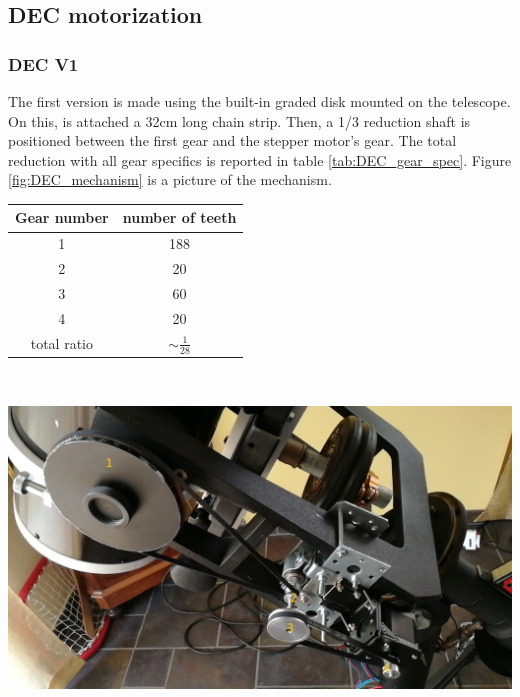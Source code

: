 \documentclass{article}
\begin{document}
\begin{multicols}{2}
\begin{minipage}{.5\textwidth}
            \label{fig:RA_mechanization}         
        \end{minipage}

        \subsection{DEC motorization}
        \subsubsection{DEC V1}
        The first version is made using the built-in graded disk mounted on the telescope.
        On this, is attached a 32cm long chain strip.
        Then, a 1/3 reduction shaft is positioned between the first gear and the stepper motor's gear.
        The total reduction with all gear specifics is reported in table \ref{tab:DEC_gear_spec}.
        Figure \ref{fig:DEC_mechanism} is a picture of the mechanism.

        \begin{minipage}
            {0.5\textwidth}
            \centering
            \begin{tabular}{cc}
                Gear number & number of teeth \\
                \hline
                1 & 188 \\
                2 & 20 \\
                3 & 60 \\
                4 & 20 \\
                \hline
                total ratio & \(\sim \frac{1}{28}\)
            \end{tabular}
            \label{tab:DEC_gear_spec}
        \end{minipage}
        \\
        \begin{minipage}
            {0.5\textwidth}
            \centering
            \includegraphics[scale=.27]{DEC_motorization.jpg}
            \label{fig:DEC_mechanism}
        \end{minipage}


\end{multicols}
\end{document}

